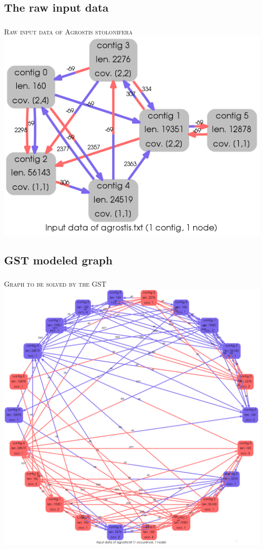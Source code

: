 \documentclass{beamer}
\begin{document}
\subsection{The raw input data}\label{5}
\begin{frame}
\frametitle{\textsc{}}
\textsc{Raw input data of Agrostis stolonifera} \\
\includegraphics[scale=0.4]{agrostis_INPT_graph.png}
\end{frame}
\subsection{GST modeled graph}\label{6}
\begin{frame}
\frametitle{\textsc{}}
\textsc{Graph to be solved by the GST} \\
\includegraphics[scale=0.13]{agrostis_INPT_graph_model.png}
\end{frame}
\end{document}
